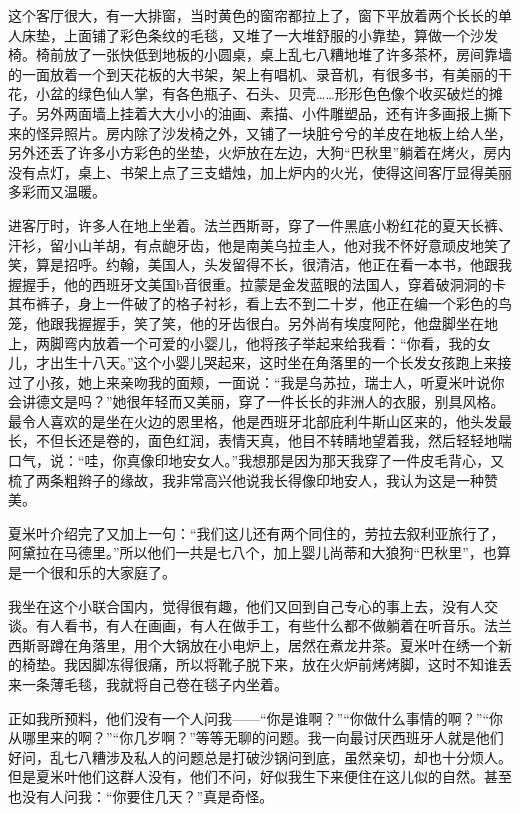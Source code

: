 \par 这个客厅很大，有一大排窗，当时黄色的窗帘都拉上了，窗下平放着两个长长的单人床垫，上面铺了彩色条纹的毛毯，又堆了一大堆舒服的小靠垫，算做一个沙发椅。椅前放了一张快低到地板的小圆桌，桌上乱七八糟地堆了许多茶杯，房间靠墙的一面放着一个到天花板的大书架，架上有唱机、录音机，有很多书，有美丽的干花，小盆的绿色仙人掌，有各色瓶子、石头、贝壳……形形色色像个收买破烂的摊子。另外两面墙上挂着大大小小的油画、素描、小件雕塑品，还有许多画报上撕下来的怪异照片。房内除了沙发椅之外，又铺了一块脏兮兮的羊皮在地板上给人坐，另外还丢了许多小方彩色的坐垫，火炉放在左边，大狗“巴秋里”躺着在烤火，房内没有点灯，桌上、书架上点了三支蜡烛，加上炉内的火光，使得这间客厅显得美丽多彩而又温暖。
\par 进客厅时，许多人在地上坐着。法兰西斯哥，穿了一件黑底小粉红花的夏天长裤、汗衫，留小山羊胡，有点龅牙齿，他是南美乌拉圭人，他对我不怀好意顽皮地笑了笑，算是招呼。约翰，美国人，头发留得不长，很清洁，他正在看一本书，他跟我握握手，他的西班牙文美国b音很重。拉蒙是金发蓝眼的法国人，穿着破洞洞的卡其布裤子，身上一件破了的格子衬衫，看上去不到二十岁，他正在编一个彩色的鸟笼，他跟我握握手，笑了笑，他的牙齿很白。另外尚有埃度阿陀，他盘脚坐在地上，两脚弯内放着一个可爱的小婴儿，他将孩子举起来给我看：“你看，我的女儿，才出生十八天。”这个小婴儿哭起来，这时坐在角落里的一个长发女孩跑上来接过了小孩，她上来亲吻我的面颊，一面说：“我是乌苏拉，瑞士人，听夏米叶说你会讲德文是吗？”她很年轻而又美丽，穿了一件长长的非洲人的衣服，别具风格。最令人喜欢的是坐在火边的恩里格，他是西班牙北部庇利牛斯山区来的，他头发最长，不但长还是卷的，面色红润，表情天真，他目不转睛地望着我，然后轻轻地喘口气，说：“哇，你真像印地安女人。”我想那是因为那天我穿了一件皮毛背心，又梳了两条粗辫子的缘故，我非常高兴他说我长得像印地安人，我认为这是一种赞美。
\par 夏米叶介绍完了又加上一句：“我们这儿还有两个同住的，劳拉去叙利亚旅行了，阿黛拉在马德里。”所以他们一共是七八个，加上婴儿尚蒂和大狼狗“巴秋里”，也算是一个很和乐的大家庭了。
\par 我坐在这个小联合国内，觉得很有趣，他们又回到自己专心的事上去，没有人交谈。有人看书，有人在画画，有人在做手工，有些什么都不做躺着在听音乐。法兰西斯哥蹲在角落里，用个大锅放在小电炉上，居然在煮龙井茶。夏米叶在绣一个新的椅垫。我因脚冻得很痛，所以将靴子脱下来，放在火炉前烤烤脚，这时不知谁丢来一条薄毛毯，我就将自己卷在毯子内坐着。
\par 正如我所预料，他们没有一个人问我——“你是谁啊？”“你做什么事情的啊？”“你从哪里来的啊？”“你几岁啊？”等等无聊的问题。我一向最讨厌西班牙人就是他们好问，乱七八糟涉及私人的问题总是打破沙锅问到底，虽然亲切，却也十分烦人。但是夏米叶他们这群人没有，他们不问，好似我生下来便住在这儿似的自然。甚至也没有人问我：“你要住几天？”真是奇怪。
